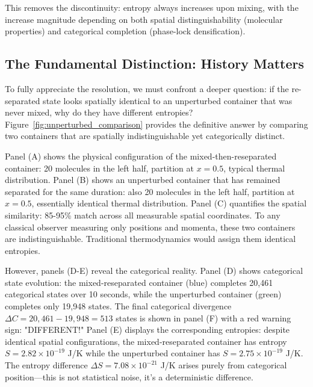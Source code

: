 \documentclass[twocolumn,superscriptaddress,prb,10pt]{revtex4-2}
\theoremstyle{definition}
\theoremstyle{remark}
\begin{document}
This removes the discontinuity: entropy always increases upon mixing, with the increase magnitude depending on both spatial distinguishability (molecular properties) and categorical completion (phase-lock densification).

\subsection{The Fundamental Distinction: History Matters}

To fully appreciate the resolution, we must confront a deeper question: if the re-separated state looks spatially identical to an unperturbed container that was never mixed, why do they have different entropies? Figure~\ref{fig:unperturbed_comparison} provides the definitive answer by comparing two containers that are spatially indistinguishable yet categorically distinct.

Panel (A) shows the physical configuration of the mixed-then-reseparated container: 20 molecules in the left half, partition at $x = 0.5$, typical thermal distribution. Panel (B) shows an unperturbed container that has remained separated for the same duration: also 20 molecules in the left half, partition at $x = 0.5$, essentially identical thermal distribution. Panel (C) quantifies the spatial similarity: 85-95\% match across all measurable spatial coordinates. To any classical observer measuring only positions and momenta, these two containers are indistinguishable. Traditional thermodynamics would assign them identical entropies.

However, panels (D-E) reveal the categorical reality. Panel (D) shows categorical state evolution: the mixed-reseparated container (blue) completes 20,461 categorical states over 10 seconds, while the unperturbed container (green) completes only 19,948 states. The final categorical divergence $\Delta C = 20{,}461 - 19{,}948 = 513$ states is shown in panel (F) with a red warning sign: "DIFFERENT!" Panel (E) displays the corresponding entropies: despite identical spatial configurations, the mixed-reseparated container has entropy $S = 2.82 \times 10^{-19}$ J/K while the unperturbed container has $S = 2.75 \times 10^{-19}$ J/K. The entropy difference $\Delta S = 7.08 \times 10^{-21}$ J/K arises purely from categorical position—this is not statistical noise, it's a deterministic difference.
\end{document}
